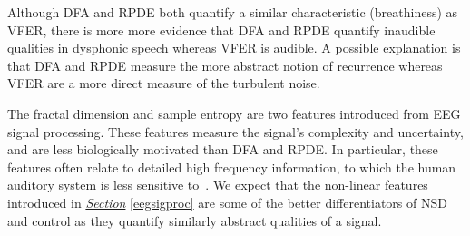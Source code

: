 \documentclass[12pt, twoside]{book}
\begin{document}
Although DFA and RPDE both quantify a similar characteristic (breathiness) as VFER, there is more more evidence that DFA and RPDE quantify inaudible qualities in dysphonic speech whereas VFER is audible. A possible explanation is that DFA and RPDE measure the more abstract notion of recurrence whereas VFER are a more direct measure of the turbulent noise. 



The fractal dimension and sample entropy are two features introduced from EEG signal processing. These features measure the signal's complexity and uncertainty, and are less biologically motivated than DFA and RPDE. In particular, these features often relate to detailed high frequency information, to which the human auditory system is less sensitive to~\cite{auditoryrange}. We  expect that the non-linear features introduced in \textit{\hyperref[eegsigproc]{Section}} \ref{eegsigproc} are some of the better differentiators of NSD and control as they quantify similarly abstract qualities of a signal.
\end{document}
